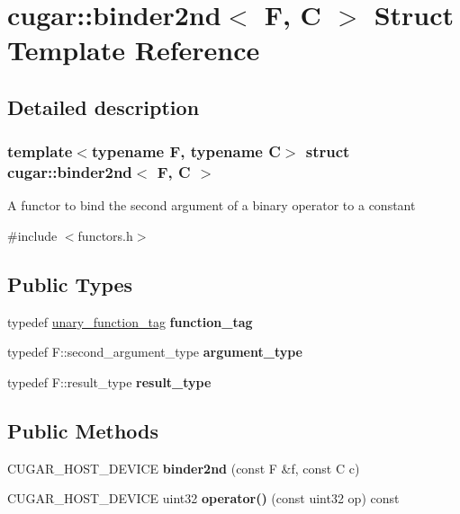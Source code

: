 \hypertarget{structcugar_1_1binder2nd}{}\section{cugar\+:\+:binder2nd$<$ F, C $>$ Struct Template Reference}
\label{structcugar_1_1binder2nd}


\subsection{Detailed description}
\subsubsection*{template$<$typename F, typename C$>$\newline
struct cugar\+::binder2nd$<$ F, C $>$}

A functor to bind the second argument of a binary operator to a constant 

{\ttfamily \#include $<$functors.\+h$>$}

\subsection*{Public Types}
\begin{DoxyCompactItemize}
\item 
\mbox{\label{structcugar_1_1binder2nd_a8d5599f0144e6aa623993a1a05a912b6}} 
typedef \hyperlink{structcugar_1_1unary__function__tag}{unary\+\_\+function\+\_\+tag} {\bfseries function\+\_\+tag}
\item 
\mbox{\label{structcugar_1_1binder2nd_aaa946faf0f7ebeca511791eb02cbd2e9}} 
typedef F\+::second\+\_\+argument\+\_\+type {\bfseries argument\+\_\+type}
\item 
\mbox{\label{structcugar_1_1binder2nd_abcb05a6f2c3cb6c26105c43ffe4598a3}} 
typedef F\+::result\+\_\+type {\bfseries result\+\_\+type}
\end{DoxyCompactItemize}
\subsection*{Public Methods}
\begin{DoxyCompactItemize}
\item 
\mbox{\label{structcugar_1_1binder2nd_a49095c1e254a1bdec20ab5b94b2aec23}} 
C\+U\+G\+A\+R\+\_\+\+H\+O\+S\+T\+\_\+\+D\+E\+V\+I\+CE {\bfseries binder2nd} (const F \&f, const C c)
\item 
\mbox{\label{structcugar_1_1binder2nd_a847679bcd7f2595a9561a64933d958e4}} 
C\+U\+G\+A\+R\+\_\+\+H\+O\+S\+T\+\_\+\+D\+E\+V\+I\+CE uint32 {\bfseries operator()} (const uint32 op) const
\end{DoxyCompactItemize}

